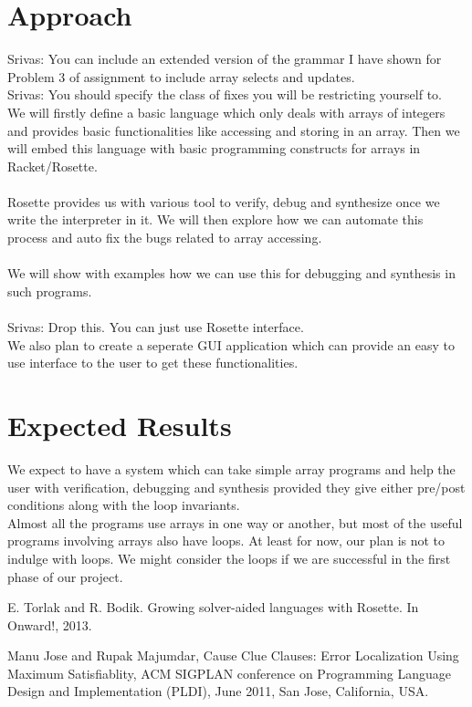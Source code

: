 \documentclass[a4paper, 12pt, notitlepage] {article}
\newcommand{\mscmt}[1]{{\color{blue} \tiny{Srivas: {#1}}}}
\begin{document}
\section {Approach}
\mscmt{You can include an extended version of the grammar I have shown for Problem 3 of assignment to include array selects and updates.} \\
\mscmt{You should specify the class of fixes you will be restricting yourself to.} \\
We will firstly define a basic language which only deals with arrays of integers and provides basic functionalities like accessing and storing in an array. Then we will embed this language with basic programming constructs for arrays in Racket/Rosette.\\
\\
Rosette provides us with various tool to verify, debug and synthesize once we write the interpreter in it. We will then explore how we can automate this process and auto fix the bugs related to array accessing.
\\
\\
We will show with examples how we can use this for debugging and synthesis in such programs.\\
\\
\mscmt{Drop this.  You can just use Rosette interface.}\\
We also plan to create a seperate GUI application which can provide an easy to use interface to the user to get these functionalities. 


\section{Expected Results}
We expect to have a system which can take simple array programs and help the user with verification, debugging and synthesis provided they give either pre/post conditions along with the loop invariants.
\\
Almost all the programs use arrays in one way or another, but most of the useful programs involving arrays also have loops. At least for now, our plan is not to indulge with loops. We might consider the loops if we are successful in the first phase of our project. 


\begin{thebibliography}{unsrt}
	
	E. Torlak and R. Bodik. Growing solver-aided languages with Rosette. In Onward!, 2013.
	
	Manu Jose and Rupak Majumdar, Cause Clue Clauses: Error Localization Using Maximum Satisfiablity, ACM SIGPLAN conference on Programming Language Design and Implementation (PLDI), June 2011, San Jose, California, USA.
	
\end{thebibliography}
\end{document}

